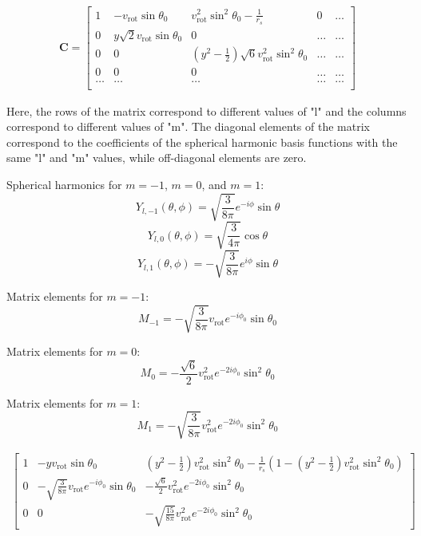 \documentclass[modern]{aastex631}
\begin{document}
\begin{multline}
    \mathbf{C} = \begin{bmatrix}
    1 & -v_{\text{rot}}\sin{\theta_0} & v_{\text{rot}}^2\sin^2{\theta_0} - \frac{1}{r_s} & 0 & \ldots \\
    0 & y\sqrt{2}v_{\text{rot}}\sin{\theta_0} & 0 & \ldots & \ldots \\
    0 & 0 & (y^2 - \frac{1}{2})\sqrt{6}v_{\text{rot}}^2\sin^2{\theta_0} & \ldots & \ldots \\
    0 & 0 & 0 & \ldots & \ldots \\
    \ldots & \ldots & \ldots & \ldots & \ldots \\
    \end{bmatrix}
\end{multline}

Here, the rows of the matrix correspond to different values of "l" and the columns correspond to different values of "m". 
The diagonal elements of the matrix correspond to the coefficients of the spherical harmonic basis functions with the same "l" and "m" values, 
while off-diagonal elements are zero.

Spherical harmonics for \(m = -1\), \(m = 0\), and \(m = 1\):
$$Y_{l,-1}(\theta, \phi) = \sqrt{\frac{3}{8\pi}}e^{-i\phi}\sin\theta$$
$$Y_{l,0}(\theta, \phi) = \sqrt{\frac{3}{4\pi}}\cos\theta$$
$$Y_{l,1}(\theta, \phi) = -\sqrt{\frac{3}{8\pi}}e^{i\phi}\sin\theta$$

Matrix elements for \(m = -1\):
$$M_{-1} = -\sqrt{\frac{3}{8\pi}}v_{\text{rot}}e^{-i\phi_0}\sin\theta_0$$

Matrix elements for \(m = 0\):
$$M_{0} = -\frac{\sqrt{6}}{2}v_{\text{rot}}^2e^{-2i\phi_0}\sin^2\theta_0$$

Matrix elements for \(m = 1\):
$$M_{1} = -\sqrt{\frac{3}{8\pi}}v_{\text{rot}}^2e^{-2i\phi_0}\sin^2\theta_0$$

\begin{multline}
    \begin{bmatrix}
        1 & -yv_{\text{rot}}\sin\theta_0 & (y^2 - \frac{1}{2})v_{\text{rot}}^2\sin^2\theta_0 - \frac{1}{r_s}(1 - (y^2 - \frac{1}{2})v_{\text{rot}}^2\sin^2\theta_0) \\
        0 & -\sqrt{\frac{3}{8\pi}}v_{\text{rot}}e^{-i\phi_0}\sin\theta_0 & -\frac{\sqrt{6}}{2}v_{\text{rot}}^2e^{-2i\phi_0}\sin^2\theta_0 \\
        0 & 0 & -\sqrt{\frac{15}{8\pi}}v_{\text{rot}}^2e^{-2i\phi_0}\sin^2\theta_0
    \end{bmatrix}
\end{multline}



\end{document}
